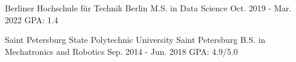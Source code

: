 

\begin{cventries}

  \cventryshort
    {Berliner Hochschule für Technik}
    {Berlin}
    {M.S. in Data Science}
    {Oct. 2019 - Mar. 2022}
    {GPA: 1.4}

  \cventryshort
    {Saint Petersburg State Polytechnic University}
    {Saint Petersburg}
    {B.S. in Mechatronics and Robotics}
    {Sep. 2014 - Jun. 2018}
    {GPA: 4.9/5.0}

\end{cventries}
